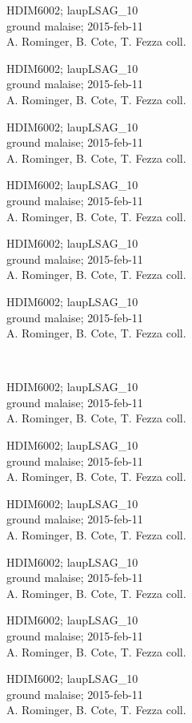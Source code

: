 \documentclass[2pt]{extarticle}
\begin{document}
\noindent
\parbox{0.16\textwidth}{\tiny \raggedright \rule[-0.3\baselineskip]{0pt}{10pt}HDIM6002; laupLSAG\_10\\ ground malaise; 2015-feb-11\\ A. Rominger, B. Cote, T. Fezza coll.}
\parbox{0.16\textwidth}{\tiny \raggedright \rule[-0.3\baselineskip]{0pt}{10pt}HDIM6002; laupLSAG\_10\\ ground malaise; 2015-feb-11\\ A. Rominger, B. Cote, T. Fezza coll.}
\parbox{0.16\textwidth}{\tiny \raggedright \rule[-0.3\baselineskip]{0pt}{10pt}HDIM6002; laupLSAG\_10\\ ground malaise; 2015-feb-11\\ A. Rominger, B. Cote, T. Fezza coll.}
\parbox{0.16\textwidth}{\tiny \raggedright \rule[-0.3\baselineskip]{0pt}{10pt}HDIM6002; laupLSAG\_10\\ ground malaise; 2015-feb-11\\ A. Rominger, B. Cote, T. Fezza coll.}
\parbox{0.16\textwidth}{\tiny \raggedright \rule[-0.3\baselineskip]{0pt}{10pt}HDIM6002; laupLSAG\_10\\ ground malaise; 2015-feb-11\\ A. Rominger, B. Cote, T. Fezza coll.}
\parbox{0.16\textwidth}{\tiny \raggedright \rule[-0.3\baselineskip]{0pt}{10pt}HDIM6002; laupLSAG\_10\\ ground malaise; 2015-feb-11\\ A. Rominger, B. Cote, T. Fezza coll.} \\ 
\vspace{0.001in} 

\noindent
\parbox{0.16\textwidth}{\tiny \raggedright \rule[-0.3\baselineskip]{0pt}{10pt}HDIM6002; laupLSAG\_10\\ ground malaise; 2015-feb-11\\ A. Rominger, B. Cote, T. Fezza coll.}
\parbox{0.16\textwidth}{\tiny \raggedright \rule[-0.3\baselineskip]{0pt}{10pt}HDIM6002; laupLSAG\_10\\ ground malaise; 2015-feb-11\\ A. Rominger, B. Cote, T. Fezza coll.}
\parbox{0.16\textwidth}{\tiny \raggedright \rule[-0.3\baselineskip]{0pt}{10pt}HDIM6002; laupLSAG\_10\\ ground malaise; 2015-feb-11\\ A. Rominger, B. Cote, T. Fezza coll.}
\parbox{0.16\textwidth}{\tiny \raggedright \rule[-0.3\baselineskip]{0pt}{10pt}HDIM6002; laupLSAG\_10\\ ground malaise; 2015-feb-11\\ A. Rominger, B. Cote, T. Fezza coll.}
\parbox{0.16\textwidth}{\tiny \raggedright \rule[-0.3\baselineskip]{0pt}{10pt}HDIM6002; laupLSAG\_10\\ ground malaise; 2015-feb-11\\ A. Rominger, B. Cote, T. Fezza coll.}
\parbox{0.16\textwidth}{\tiny \raggedright \rule[-0.3\baselineskip]{0pt}{10pt}HDIM6002; laupLSAG\_10\\ ground malaise; 2015-feb-11\\ A. Rominger, B. Cote, T. Fezza coll.} \\ 
\vspace{0.001in} 
\end{document}
